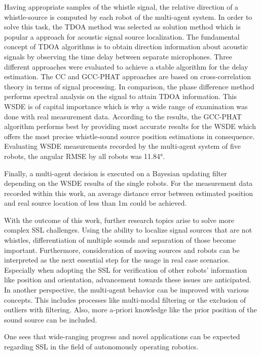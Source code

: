 Having appropriate samples of the whistle signal, the relative direction of a whistle-source
is computed by each robot of the multi-agent system.
In order to solve this task, the \acf{TDOA} method was selected as solution method
which is popular a approach for acoustic signal source localization.
The fundamental concept of \ac{TDOA} algorithms is to obtain direction information
about acoustic signals by observing the time delay between separate microphones.
Three different approaches were evaluated to achieve a stable algorithm for the delay estimation.
The \acf{CC} and \acf{GCC-PHAT} approaches are based on cross-correlation theory in terms
of signal processing.
In comparison, the phase difference method performs spectral analysis on the signal
to attain \ac{TDOA} information.
This \acf{WSDE} is of capital importance which is why a wide range of examination
was done with real measurement data.
According to the results, the \acf{GCC-PHAT} algorithm performs best by
providing most accurate results for the \ac{WSDE} which offers the most precise
whistle-sound source position estimations in consequence.
Evaluating \ac{WSDE} measurements recorded by the multi-agent system of five robots,
the angular \ac{RMSE} by all robots was 11.84\si{\degree}.

Finally, a multi-agent decision is executed on a Bayesian updating filter
depending on the \ac{WSDE} results of the single robots.
For the measurement data recorded within this work, an average
distance error between estimated position and real source location
of less than 1\si{\meter} could be achieved.

With the outcome of this work, further research topics arise to solve
more complex \ac{SSL} challenges.
Using the ability to localize signal sources that are not whistles,
differentiation of multiple sounds and separation of those become important.
Furthermore, consideration of moving sources and robots can be interpreted
as the next essential step for the usage in real case scenarios.
Especially when adopting the \ac{SSL} for verification of other robots' information
like position and orientation, advancement towards these issues are
anticipated.
In another perspective, the multi-agent behavior can be improved with various
concepts.
This includes processes like multi-modal filtering or the exclusion of outliers
with filtering.
Also, more a-priori knowledge like the prior position of the sound source can be included.

One sees that wide-ranging progress and novel applications can be expected regarding \ac{SSL}
in the field of autonomously operating robotics.

